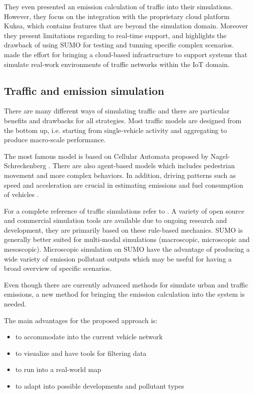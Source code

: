 \documentclass[letter, 10pt, conference]{ieeeconf}
\begin{document}
They even presented an emission calculation of traffic into their simulations.
However, they focus on the integration with the proprietary cloud platform Kuksa, which contains features that are beyond the simulation domain.
Moreover they present limitations regarding to real-time support, and highlights the drawback of using SUMO for testing and tunning specific complex scenarios.
\cite{tarneberg_experiences_2016} made the effort for bringing a cloud-based infrastructure to support systems that simulate real-work environments of traffic networks within the IoT domain.

\subsection{Traffic and emission simulation}

There are many different ways of simulating traffic and there are particular benefits and drawbacks for all strategies.
Most traffic models are designed from the bottom up, i.e. starting from single-vehicle activity and aggregating to produce macro-scale performance.

The most famous model is based on Cellular Automata proposed by Nagel-Schreckenberg \cite{nagel_cellular_1992}.
There are also agent-based models which includes pedestrian movement and more complex behaviors.
In addition, driving patterns such as speed and acceleration are crucial in estimating emissions and fuel consumption of vehicles \cite{markiewicz_reduction_2017}.

For a complete reference of traffic simulations refer to \cite{kotusevski_review_nodate}.
A variety of open source and commercial simulation tools are available due to ongoing research and development, they are primarily based on these rule-based mechanics.
SUMO is generally better suited for multi-modal simulations (macroscopic, microscopic and mesoscopic).
Microscopic simulation on SUMO have the advantage of producing a wide variety of emission pollutant outputs which may be useful for having a broad overview of specific scenarios.

Even though there are currently advanced methods for simulate urban and traffic emissions, a new method for bringing the emission calculation into the system is needed.

The main advantages for the proposed approach is:
\begin{itemize}
\item to accommodate into the current vehicle network
\item to visualize and have tools for filtering data
\item to run into a real-world map
\item to adapt into possible developments and pollutant types
\end{itemize}
\end{document}
